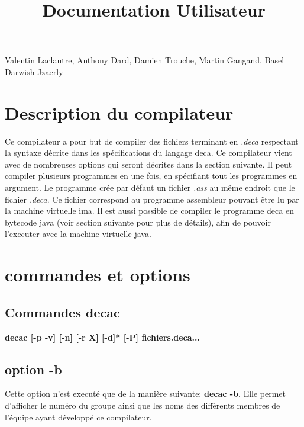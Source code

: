 \documentclass[12pt, a4paper, one side]{article}
\title{Documentation Utilisateur}
\author{}
\date{}
\begin{document}
\maketitle

\begin{center}
    Valentin Laclautre, Anthony Dard, Damien Trouche, Martin Gangand, Basel Darwish Jzaerly
\end{center}

\tableofcontents

\newpage

\section{Description du compilateur}

Ce compilateur a pour but de compiler des fichiers terminant en \textit{.deca}
respectant la syntaxe décrite dans les spécifications du langage deca. Ce compilateur
vient avec de nombreuses options qui seront décrites dans la section suivante. Il
peut compiler plusieurs programmes en une fois, en spécifiant tout les programmes
en argument. Le programme crée par défaut un fichier \textit{.ass} au même endroit que
le fichier \textit{.deca}. Ce fichier correspond au programme assembleur pouvant être lu
par la machine virtuelle ima. Il est aussi possible de compiler le programme deca en
bytecode java (voir section suivante pour plus de détails), afin de pouvoir l'executer
avec la machine virtuelle java.

\section{commandes et options}

\subsection{Commandes decac}

\textbf{decac [-p \textbar -v] [-n] [-r X] [-d]* [-P] fichiers.deca... \textbar [-b]}

\subsection{option -b}

Cette option n'est executé que de la manière suivante: \textbf{decac -b}. Elle permet
d'afficher le numéro du groupe ainsi que les noms des différents membres de l'équipe
ayant développé ce compilateur. 
\end{document}
